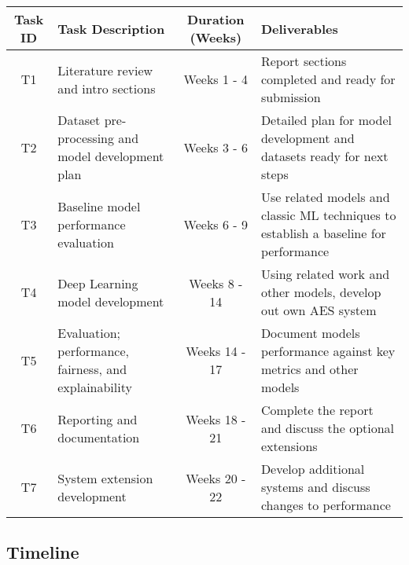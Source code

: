 \documentclass[11pt]{article}
\begin{document}
\begin{center}
    \renewcommand{\arraystretch}{1.5}
    \begin{tabular}{|c|p{5cm}|c|p{6cm}|} 
        \hline
        \textbf{Task ID} & \textbf{Task Description} & \textbf{Duration (Weeks)} & \textbf{Deliverables} \\ 
        \hline
        T1 & Literature review and intro sections & Weeks 1 - 4 & Report sections completed and ready for submission \\ 
        \hline
        T2 & Dataset pre-processing and model development plan & Weeks 3 - 6 & Detailed plan for model development and datasets ready for next steps \\ 
        \hline
        T3 & Baseline model performance evaluation & Weeks 6 - 9 & Use related models and classic ML techniques to establish a baseline for performance \\ 
        \hline
        T4 & Deep Learning model development & Weeks 8 - 14 & Using related work and other models, develop out own AES system \\ 
        \hline
        T5 & Evaluation; performance, fairness, and explainability & Weeks 14 - 17  & Document models performance against key metrics and other models \\ 
        \hline
        T6 & Reporting and documentation & Weeks 18 - 21 & Complete the report and discuss the optional extensions \\ 
        \hline
        T7 & System extension development & Weeks 20 - 22 & Develop additional systems and discuss changes to performance \\ 
        \hline
    \end{tabular}
    \end{center}

\subsection*{Timeline}

\end{document}
